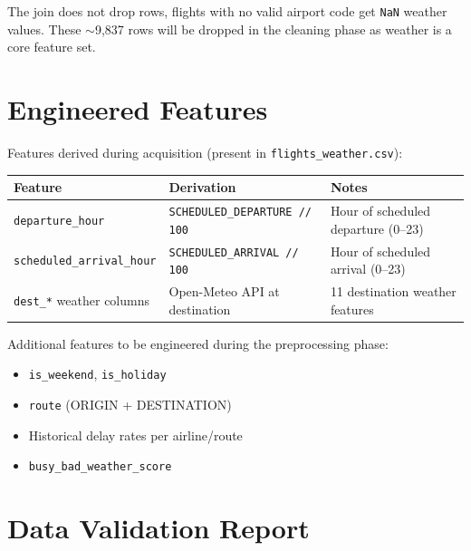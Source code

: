 \documentclass{article}
\newcommand{\code}[1]{\texttt{\small #1}}
\begin{document}
\begin{tcolorbox}[quotebox]
The join does not drop rows, flights with no valid airport code get \code{NaN} weather values. These $\sim$9,837 rows will be dropped in the cleaning phase as weather is a core feature set.
\end{tcolorbox}

\section{\textcolor{accentblue}{Engineered Features}}

Features derived during acquisition (present in \code{flights\_weather.csv}):

\begin{tcolorbox}[mainbox, title={Acquired Engineered Features}]
\renewcommand{\arraystretch}{1.4}
\begin{tabularx}{\textwidth}{L{4cm} L{5.5cm} X}
    \toprule
    \textbf{Feature} & \textbf{Derivation} & \textbf{Notes} \\
    \midrule
    \code{departure\_hour}          & \code{SCHEDULED\_DEPARTURE // 100}  & Hour of scheduled departure (0--23) \\
    \code{scheduled\_arrival\_hour} & \code{SCHEDULED\_ARRIVAL // 100}    & Hour of scheduled arrival (0--23) \\
    \code{dest\_*} weather columns  & Open-Meteo API at destination       & 11 destination weather features \\
    \bottomrule
\end{tabularx}
\end{tcolorbox}

Additional features to be engineered during the preprocessing phase:

\begin{itemize}[label=\textcolor{accentblue}{\textbullet}]
    \item \code{is\_weekend}, \code{is\_holiday}
    \item \code{route} (ORIGIN + DESTINATION)
    \item Historical delay rates per airline/route
    \item \code{busy\_bad\_weather\_score}
\end{itemize}

\section{\textcolor{accentblue}{Data Validation Report}}
\end{document}

